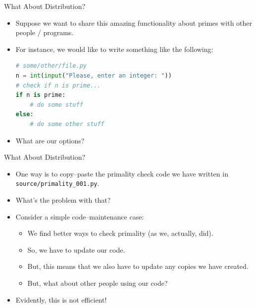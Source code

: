 \documentclass[aspectratio=169, 12pt, xcolor=table]{beamer}
\begin{document}
	\begin{frame}[fragile]{What About Distribution?}
		\begin{itemize}
			\item Suppose we want to share this amazing functionality about primes with other people / programs.\pause
			\item For instance, we would like to write something like the following:
			\begin{lstlisting}[language=Python]
# some/other/file.py
n = int(input("Please, enter an integer: "))
# check if n is prime...
if n is prime:
    # do some stuff
else:
    # do some other stuff
\end{lstlisting}\pause
			\item What are our options?
		\end{itemize}
	\end{frame}

	\begin{frame}{What About Distribution?}
		\begin{itemize}
			\item One way is to copy--paste the primality check code we have written in \texttt{source/primality\_001.py}.\pause
			\item What's the problem with that?\pause
			\item Consider a simple code--maintenance case:\pause
			\begin{itemize}
				\item We find better ways to check primality (as we, actually, did).
				\item So, we have to update our code.
				\item But, this means that we also have to update any copies we have created.
				\item But, what about other people using our code?\pause
			\end{itemize}
			\item Evidently, this is not efficient!
		\end{itemize}
	\end{frame}
	
\end{document}
